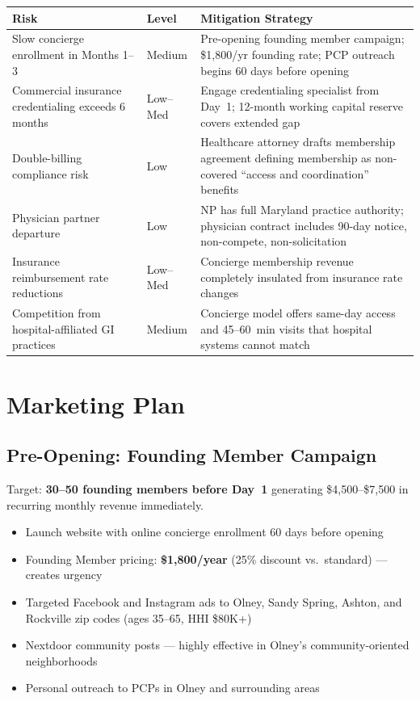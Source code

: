 \documentclass[11pt,letterpaper]{article}
\newcommand{\thead}[1]{\cellcolor{navy}\color{white}\bfseries\small #1}
\newcommand{\trow}{\rowcolor{rowshade}}
\begin{document}
\vspace{6pt}
\begin{tabularx}{\linewidth}{|>{\small}p{3.2cm}|>{\small}p{1.6cm}|>{\small}X|}
\hline
\thead{Risk} & \thead{Level} & \thead{Mitigation Strategy} \\
\hline
\trow Slow concierge enrollment in Months 1--3 & Medium & Pre-opening founding member campaign; \$1,800/yr founding rate; PCP outreach begins 60 days before opening \\
Commercial insurance credentialing exceeds 6 months & Low--Med & Engage credentialing specialist from Day~1; 12-month working capital reserve covers extended gap \\
\trow Double-billing compliance risk & Low & Healthcare attorney drafts membership agreement defining membership as non-covered ``access and coordination'' benefits \\
Physician partner departure & Low & NP has full Maryland practice authority; physician contract includes 90-day notice, non-compete, non-solicitation \\
\trow Insurance reimbursement rate reductions & Low--Med & Concierge membership revenue completely insulated from insurance rate changes \\
Competition from hospital-affiliated GI practices & Medium & Concierge model offers same-day access and 45--60~min visits that hospital systems cannot match \\
\hline
\end{tabularx}

\newpage

\section{Marketing Plan}

\subsection{Pre-Opening: Founding Member Campaign}

Target: \textbf{30--50 founding members before Day~1} generating \$4,500--\$7,500 in recurring monthly revenue immediately.

\begin{itemize}
  \item Launch website with online concierge enrollment 60 days before opening
  \item Founding Member pricing: \textbf{\$1,800/year} (25\% discount vs.\ standard) --- creates urgency
  \item Targeted Facebook and Instagram ads to Olney, Sandy Spring, Ashton, and Rockville zip codes (ages 35--65, HHI \$80K+)
  \item Nextdoor community posts --- highly effective in Olney's community-oriented neighborhoods
  \item Personal outreach to PCPs in Olney and surrounding areas
\end{itemize}
\end{document}
